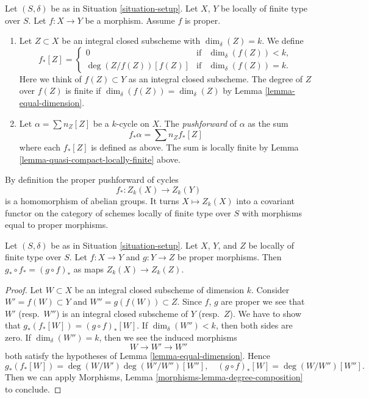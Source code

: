 \begin{definition}
\label{definition-proper-pushforward}
Let $(S, \delta)$ be as in Situation \ref{situation-setup}.
Let $X$, $Y$ be locally of finite type over $S$.
Let $f : X \to Y$ be a morphism.
Assume $f$ is proper.
\begin{enumerate}
\item Let $Z \subset X$ be an integral closed subscheme
with $\dim_\delta(Z) = k$. We define
$$
f_*[Z] =
\left\{
\begin{matrix}
0 & \text{if} & \dim_\delta(f(Z))< k, \\
\deg(Z/f(Z)) [f(Z)] & \text{if} & \dim_\delta(f(Z)) = k.
\end{matrix}
\right.
$$
Here we think of $f(Z) \subset Y$ as an integral closed subscheme.
The degree of $Z$ over $f(Z)$ is finite if
$\dim_\delta(f(Z)) = \dim_\delta(Z)$
by Lemma \ref{lemma-equal-dimension}.
\item Let $\alpha = \sum n_Z [Z]$ be a $k$-cycle on $X$. The
{\it pushforward} of $\alpha$ as the sum
$$
f_* \alpha = \sum n_Z f_*[Z]
$$
where each $f_*[Z]$ is defined as above. The sum is locally finite
by Lemma \ref{lemma-quasi-compact-locally-finite} above.
\end{enumerate}
\end{definition}

\noindent
By definition the proper pushforward of cycles
$$
f_* : Z_k(X) \longrightarrow Z_k(Y)
$$
is a homomorphism of abelian groups. It turns $X \mapsto Z_k(X)$
into a covariant functor on the category of schemes locally of
finite type over $S$ with morphisms equal to proper morphisms.

\begin{lemma}
\label{lemma-compose-pushforward}
Let $(S, \delta)$ be as in Situation \ref{situation-setup}.
Let $X$, $Y$, and $Z$ be locally of finite type over $S$.
Let $f : X \to Y$ and $g : Y \to Z$ be proper morphisms.
Then $g_* \circ f_* = (g \circ f)_*$ as maps $Z_k(X) \to Z_k(Z)$.
\end{lemma}

\begin{proof}
Let $W \subset X$ be an integral closed subscheme of dimension $k$.
Consider $W' = f(W) \subset Y$ and $W'' = g(f(W)) \subset Z$.
Since $f$, $g$ are proper we see that $W'$ (resp.\ $W''$) is
an integral closed subscheme of $Y$ (resp.\ $Z$).
We have to show that $g_*(f_*[W]) = (g \circ f)_*[W]$.
If $\dim_\delta(W'') < k$, then both sides are zero.
If $\dim_\delta(W'') = k$, then we see the induced morphisms
$$
W \longrightarrow
W' \longrightarrow
W''
$$
both satisfy the hypotheses of Lemma \ref{lemma-equal-dimension}. Hence
$$
g_*(f_*[W]) = \deg(W/W')\deg(W'/W'')[W''],
\quad
(g \circ f)_*[W] = \deg(W/W'')[W''].
$$
Then we can apply
Morphisms, Lemma \ref{morphisms-lemma-degree-composition}
to conclude.
\end{proof}

